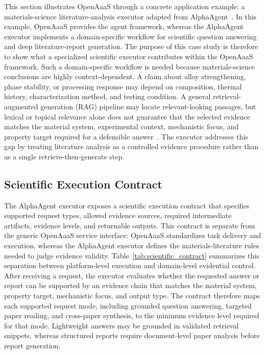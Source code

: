 \documentclass{article}
\begin{document}
This section illustrates OpenAaaS through a concrete application example: a materials-science literature-analysis executor adapted from AlphaAgent~\cite{alphaagent2026}. In this example, OpenAaaS provides the agent framework, whereas the AlphaAgent executor implements a domain-specific workflow for scientific question answering and deep literature-report generation. The purpose of this case study is therefore to show what a specialized scientific executor contributes within the OpenAaaS framework. Such a domain-specific workflow is needed because materials-science conclusions are highly context-dependent. A claim about alloy strengthening, phase stability, or processing response may depend on composition, thermal history, characterization method, and testing condition. A general retrieval-augmented generation (RAG) pipeline may locate relevant-looking passages, but lexical or topical relevance alone does not guarantee that the selected evidence matches the material system, experimental context, mechanistic focus, and property target required for a defensible answer~\cite{lewis2020retrieval,izacard2021leveraging}. The executor addresses this gap by treating literature analysis as a controlled evidence procedure rather than as a single retrieve-then-generate step.

\subsection{Scientific Execution Contract}

The AlphaAgent executor exposes a scientific execution contract that specifies supported request types, allowed evidence sources, required intermediate artifacts, evidence levels, and returnable outputs. This contract is separate from the generic OpenAaaS service interface: OpenAaaS standardizes task delivery and execution, whereas the AlphaAgent executor defines the materials-literature rules needed to judge evidence validity. Table~\ref{tab:scientific_contract} summarizes this separation between platform-level execution and domain-level evidential control. After receiving a request, the executor evaluates whether the requested answer or report can be supported by an evidence chain that matches the material system, property target, mechanistic focus, and output type. The contract therefore maps each supported request mode, including grounded question answering, targeted paper reading, and cross-paper synthesis, to the minimum evidence level required for that mode. Lightweight answers may be grounded in validated retrieval snippets, whereas structured reports require document-level paper analysis before report generation.
\end{document}
